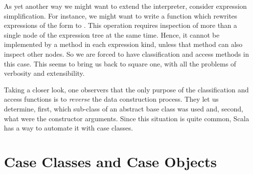 As yet another way we might want to extend the interpreter, consider
expression simplification. For instance, we might want to write a
function which rewrites expressions of the form
 to . This operation requires inspection of 
more than a single node of the expression tree at the same
time. Hence, it cannot be implemented by a method in each expression
kind, unless that method can also inspect other nodes. So we are
forced to have classification and access methods in this case. This
seems to bring us back to square one, with all the problems of
verbosity and extensibility.

Taking a closer look, one observers that the only purpose of the
classification and access functions is to {\em reverse} the data
construction process.  They let us determine, first, which sub-class
of an abstract base class was used and, second, what were the
constructor arguments. Since this situation is quite common, Scala has
a way to automate it with case classes. 

\section{Case Classes and Case Objects}

